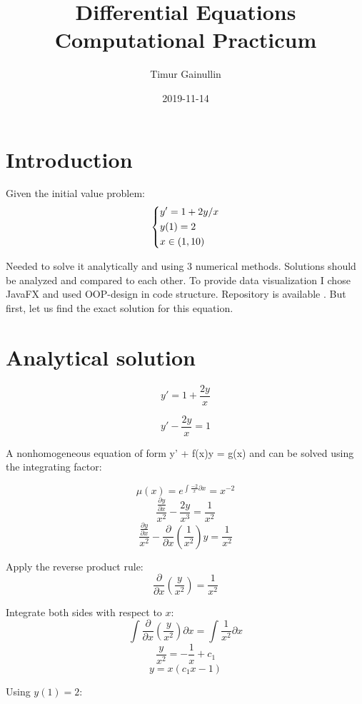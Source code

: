 \documentclass{article}
\title{Differential Equations Computational Practicum}
\date{2019-11-14}
\author{Timur Gainullin}
\begin{document}
  \maketitle

  \newpage



  \section{Introduction}

  Given the initial value problem:
  \[
    \begin{dcases}
      y' = 1 + 2y / x\\
      y(1) = 2\\
      x \in (1, 10)
    \end{dcases}
  \]

  Needed to solve it analytically and using 3 numerical methods. Solutions should be analyzed and compared to each other. To provide data visualization I chose JavaFX and used OOP-design in code structure. Repository is available
  \href{https://github.com/Tumypmyp/DE_Practicum}{}. But first, let us find the exact solution for this equation.


  \section{Analytical solution}

  $$y' = 1 + \frac{2y}{x}$$

  $$y' - \frac{2y}{x} = 1$$

  A nonhomogeneous equation of form y' + f(x)y = g(x) and can be
  solved using the integrating factor:

  $$\mu(x) = e^{\int{\frac{-2}{x} \partial x}} = x^{-2}$$
  $$\frac{\frac{\partial y}{\partial x}}{x^2} - \frac{2y}{x^3} = \frac{1}{x^2}$$
  $$\frac{\frac{\partial y}{\partial x}}{x^2} - \frac{\partial}{\partial x}\left(\frac{1}{x^2}\right)y = \frac{1}{x^2}$$

  Apply the reverse product rule:
  $$\frac{\partial}{\partial x}\left(\frac{y}{x^2}\right) = \frac{1}{x^2}$$

  Integrate both sides with respect to $x$:
  $$\int{\frac{\partial}{\partial x}\left(\frac{y}{x^2}\right)}\partial x = \int{\frac{1}{x^2}}\partial x$$
  $$ \frac{y}{x^2} = -\frac{1}{x} + c_1$$
  $$y = x(c_1x - 1)$$

  Using $y(1) = 2$:
\end{document}
